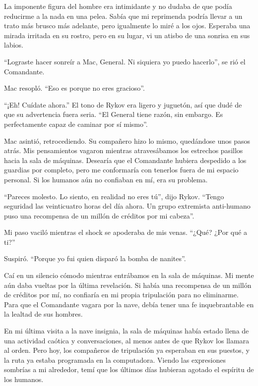 \documentclass[spanish,12pt,a4paper,oneside,titlepage]{book}
\begin{document}
    La imponente figura del hombre era intimidante y no dudaba de que podía reducirme a la nada en una pelea. Sabía que mi reprimenda podría llevar a un trato más brusco más adelante, pero igualmente lo miré a los ojos. Esperaba una mirada irritada en su rostro, pero en su lugar, vi un atisbo de una sonrisa en sus labios.

    ``Lograste hacer sonreír a Mac, General. Ni siquiera yo puedo hacerlo'', se rió el Comandante.

    Mac resopló. ``Eso es porque no eres gracioso''.

    ``¡Eh! Cuídate ahora.'' El tono de Rykov era ligero y juguetón, así que dudé de que su advertencia fuera seria. ``El General tiene razón, sin embargo. Es perfectamente capaz de caminar por sí mismo''.

    Mac asintió, retrocediendo. Su compañero hizo lo mismo, quedándose unos pasos atrás. Mis pensamientos vagaron mientras atravesábamos los estrechos pasillos hacia la sala de máquinas. Desearía que el Comandante hubiera despedido a los guardias por completo, pero me conformaría con tenerlos fuera de mi espacio personal. Si los humanos aún no confiaban en mí, era su problema.

    ``Pareces molesto. Lo siento, en realidad no eres tú'', dijo Rykov. ``Tengo seguridad las veinticuatro horas del día ahora. Un grupo extremista anti-humano puso una recompensa de un millón de créditos por mi cabeza''.

    Mi paso vaciló mientras el shock se apoderaba de mis venas. ``¿Qué? ¿Por qué a ti?''

    Suspiró. ``Porque yo fui quien disparó la bomba de nanites''.

    Caí en un silencio cómodo mientras entrábamos en la sala de máquinas. Mi mente aún daba vueltas por la última revelación. Si había una recompensa de un millón de créditos por mí, no confiaría en mi propia tripulación para no eliminarme. Para que el Comandante vagara por la nave, debía tener una fe inquebrantable en la lealtad de sus hombres.

    En mi última visita a la nave insignia, la sala de máquinas había estado llena de una actividad caótica y conversaciones, al menos antes de que Rykov los llamara al orden. Pero hoy, los compañeros de tripulación ya esperaban en sus puestos, y la ruta ya estaba programada en la computadora. Viendo las expresiones sombrías a mi alrededor, temí que los últimos días hubieran agotado el espíritu de los humanos.
\end{document}
